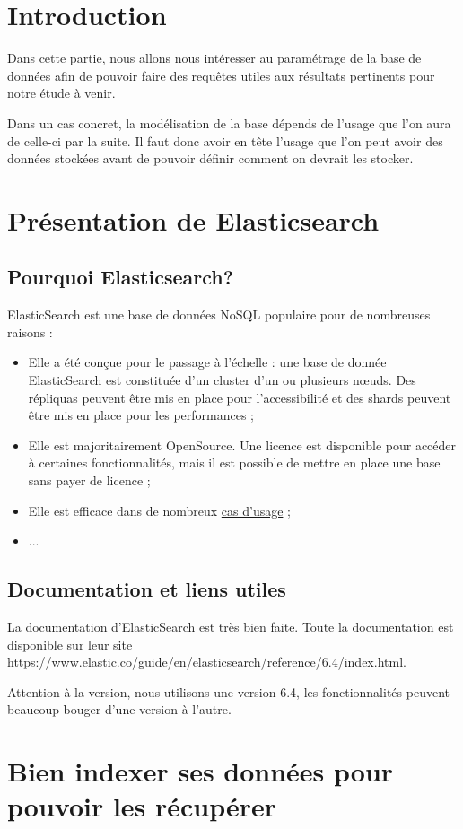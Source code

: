 \documentclass[11pt,letterpaper]{article}
\begin{document}
	\pagestyle{fancy}
	\section*{Introduction}
	Dans cette partie, nous allons nous intéresser au paramétrage de la base de données afin de pouvoir faire des requêtes utiles aux résultats pertinents pour notre étude à venir.
	
	Dans un cas concret, la modélisation de la base dépends de l'usage que l'on aura de celle-ci par la suite. Il faut donc avoir en tête l'usage que l'on peut avoir des données stockées avant de pouvoir définir comment on devrait les stocker.
	\section*{Présentation de Elasticsearch}
	\subsection*{Pourquoi Elasticsearch?}
	ElasticSearch est une base de données NoSQL populaire pour de nombreuses raisons :
	\begin{itemize}
		\item Elle a été conçue pour le passage à l'échelle : une base de donnée ElasticSearch est constituée d'un cluster d'un ou plusieurs nœuds. Des répliquas peuvent être mis en place pour l'accessibilité et des shards peuvent être mis en place pour les performances ;
		\item Elle est majoritairement OpenSource. Une licence est disponible pour accéder à certaines fonctionnalités, mais il est possible de mettre en place une base sans payer de licence ;
		\item Elle est efficace dans de nombreux \href{https://www.elastic.co/fr/blog/found-uses-of-elasticsearch}{cas d'usage} ;
		\item ...
	\end{itemize}
	\subsection*{Documentation et liens utiles}
	La documentation d'ElasticSearch est très bien faite.
	Toute la documentation est disponible sur leur site 
	 \url{https://www.elastic.co/guide/en/elasticsearch/reference/6.4/index.html}.
	 
	Attention à la version, nous utilisons une version 6.4, les fonctionnalités peuvent beaucoup bouger d'une version à l'autre.
	\section*{Bien indexer ses données pour pouvoir les récupérer}
\end{document}
